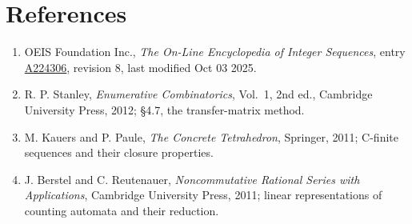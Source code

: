 \documentclass[11pt]{article}
\theoremstyle{definition}
\begin{document}
\section{References}

\begin{enumerate}

\item OEIS Foundation Inc., \emph{The On-Line Encyclopedia of Integer Sequences}, entry \href{https://oeis.org/A224306}{A224306}, revision 8, last modified Oct 03 2025.

\item R. P. Stanley, \emph{Enumerative Combinatorics}, Vol.~1, 2nd ed., Cambridge University Press, 2012; \S4.7, the transfer-matrix method.

\item M. Kauers and P. Paule, \emph{The Concrete Tetrahedron}, Springer, 2011; C-finite sequences and their closure properties.

\item J. Berstel and C. Reutenauer, \emph{Noncommutative Rational Series with Applications}, Cambridge University Press, 2011; linear representations of counting automata and their reduction.

\end{enumerate}
\end{document}
